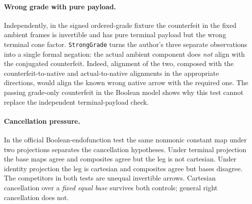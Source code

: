 \documentclass[11pt]{article}
\newcommand{\nm}[1]{\nolinkurl{#1}}
\begin{document}
\paragraph{Wrong grade with pure payload.}
Independently, in the signed ordered-grade fixture the counterfeit in the fixed ambient frames is invertible and has pure terminal payload but the wrong terminal cone factor. \nm{StrongGrade} turns the author's three separate observations into a single formal negation: the actual ambient component does \emph{not} align with the conjugated counterfeit. Indeed, alignment of the two, composed with the counterfeit-to-native and actual-to-native alignments in the appropriate directions, would align the known wrong native arrow with the required one. The passing grade-only counterfeit in the Boolean model shows why this test cannot replace the independent terminal-payload check.
\paragraph{Cancellation pressure.}
In the official Boolean-endofunction test the same nonmonic constant map under two projections separates the cancellation hypotheses. Under terminal projection the base maps agree and composites agree but the leg is not cartesian. Under identity projection the leg is cartesian and composites agree but bases disagree. The competitors in both tests are unequal invertible arrows. Cartesian cancellation over a \emph{fixed equal base} survives both controls; general right cancellation does not.
\end{document}

